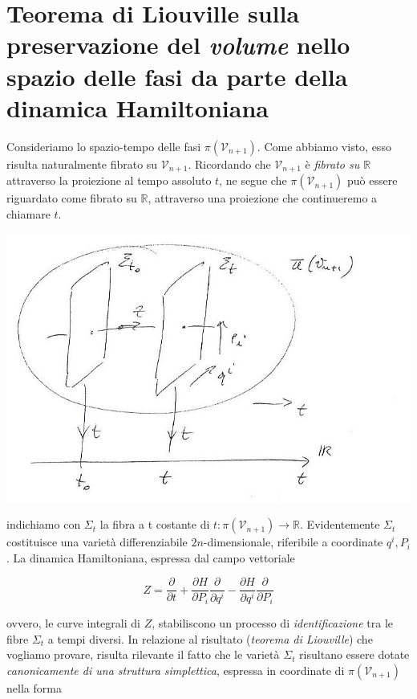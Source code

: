 \section{Teorema di Liouville sulla preservazione del \textit{volume} nello spazio delle fasi da parte della dinamica Hamiltoniana}

Consideriamo lo spazio-tempo delle fasi $ \pi (\mathcal{V}_{n+1}) $. Come abbiamo visto, esso risulta naturalmente fibrato su $ \mathcal{V}_{n+1} $. Ricordando che $ \mathcal{V}_{n+1} $ è \textit{fibrato su $ \mathbb{R} $} attraverso la proiezione al tempo assoluto $ t $, ne segue che $ \pi (\mathcal{V}_{n+1}) $ può essere riguardato come fibrato su $ \mathbb{R} $, attraverso una proiezione che continueremo a chiamare $ t $.

\begin{center}
\includegraphics[width=0.65\columnwidth]{media/teorema-di-liuville-sulla-preservazione-del-volume-nello-spazio-delle-fasi-da-parte-della-dinamica-hamiltoniana/34-1.jpg}
\end{center}

indichiamo con $ \Sigma_t $ la fibra a t costante di $ t : \pi (\mathcal{V}_{n+1}) \longrightarrow \mathbb{R} $.
Evidentemente $ \Sigma_t $ costituisce una varietà differenziabile $ 2n $-dimensionale, riferibile a coordinate $ q^i, P_i$.
La dinamica Hamiltoniana, espressa dal campo vettoriale

\begin{equation*}
 Z = \frac{\partial}{\partial t} + \frac{\partial H}{\partial P_i} \frac{\partial}{\partial q^i} - \frac{\partial H}{\partial q^i} \frac{\partial}{\partial P_i}
\end{equation*}

ovvero, le curve integrali di $ Z $, stabiliscono un processo di \textit{identificazione} tra le fibre $ \Sigma_t $ a tempi diversi. In relazione al risultato (\textit{teorema di Liouville}) che vogliamo provare, risulta rilevante il fatto che le varietà $ \Sigma_t $ risultano essere dotate \textit{canonicamente di una struttura simplettica}, espressa in coordinate di $ \pi (\mathcal{V}_{n+1}) $ nella forma

